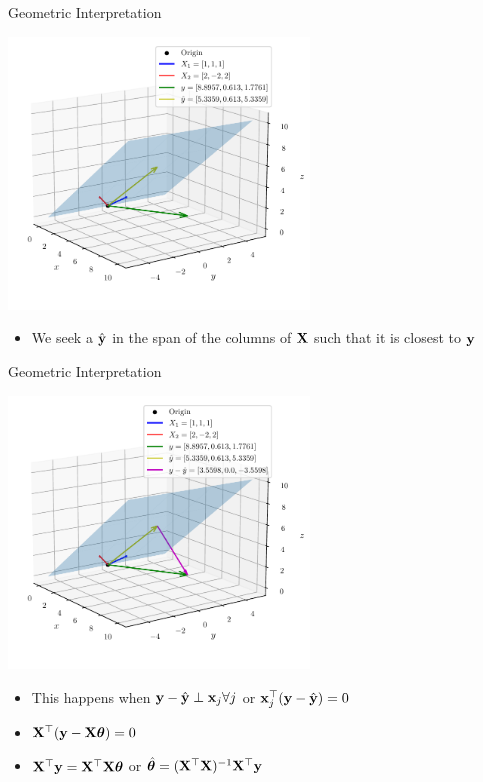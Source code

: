 \documentclass{beamer}
\begin{document}
\begin{frame}{Geometric Interpretation}	

    \includegraphics[width=0.6\textwidth]{../assets/linear-regression/figures/geometric-3.pdf}

    


\begin{itemize}[<+->]
\item We seek a $\hat{\mathbf{y}}$ in the span of the columns of $\mathbf{X}$ such that it is closest to $\mathbf{y}$
\end{itemize}

\end{frame}


\begin{frame}{Geometric Interpretation}	

    \includegraphics[width=0.6\textwidth]{../assets/linear-regression/figures/geometric-4.pdf}

    


\begin{itemize}[<+->]
\item This happens when $\mathbf{y}-\hat{\mathbf{y}}\perp \mathbf{x}_j \forall j$ or $\mathbf{x}_j^\top(\mathbf{y}-\hat{\mathbf{y}})=0$
\item $\mathbf{X}^\top(\mathbf{y}-\mathbf{X}\boldsymbol{\theta})=0$
\item $\mathbf{X}^\top\mathbf{y} = \mathbf{X}^\top\mathbf{X}\boldsymbol{\theta}$ or $\hat{\boldsymbol{\theta}} =(\mathbf{X}^\top\mathbf{X})^{-1}\mathbf{X}^\top\mathbf{y}$ 
\end{itemize}

\end{frame}
\end{document}
